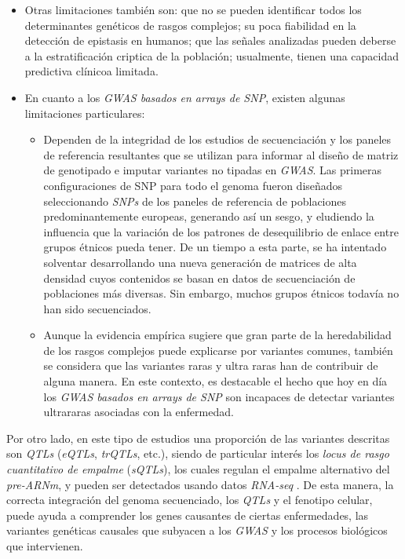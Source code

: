 \documentclass[IB,BIB]{TFUOC}%
\begin{document}
\begin{itemize}
    \item Otras limitaciones también son: que no se pueden identificar todos los determinantes genéticos de rasgos complejos; su poca fiabilidad en la detección de epistasis en humanos; que las señales analizadas pueden deberse a la estratificación criptica de la población; usualmente, tienen una capacidad predictiva clínicoa limitada.
    \item En cuanto a los \textit{GWAS basados en arrays de SNP}, existen algunas limitaciones particulares:
    \begin{itemize}
        \item Dependen de la integridad de los estudios de secuenciación y los paneles de referencia resultantes que se utilizan para informar al diseño de matriz de genotipado e imputar variantes no tipadas en \textit{GWAS}. Las primeras configuraciones de SNP para todo el genoma fueron diseñados seleccionando \textit{SNPs} de los paneles de referencia de poblaciones predominantemente europeas, generando así un sesgo, y eludiendo la influencia que la variación de los patrones de desequilibrio de enlace entre grupos étnicos pueda tener. De un tiempo a esta parte, se ha intentado solventar desarrollando una nueva generación de matrices de alta densidad cuyos contenidos se basan en datos de secuenciación de poblaciones más diversas. Sin embargo, muchos grupos étnicos todavía no han sido secuenciados.
        \item Aunque la evidencia empírica sugiere que gran parte de la heredabilidad de los rasgos complejos puede explicarse por variantes comunes, también se considera que las variantes raras y ultra raras han de contribuir de alguna manera. En este contexto, es destacable el hecho que hoy en día los \textit{GWAS basados en arrays de SNP} son incapaces de detectar variantes ultrararas asociadas con la enfermedad.
    \end{itemize}
\end{itemize}

\normalsize


Por otro lado, en este tipo de estudios una proporción de las variantes descritas son \textit{QTLs} (\textit{eQTLs}, \textit{trQTLs}, etc.), siendo de particular interés los \textit{locus de rasgo cuantitativo de empalme} (\textit{sQTLs}), los cuales regulan el empalme alternativo del \textit{pre-ARNm}, y pueden ser detectados usando datos \textit{RNA-seq} \cite{noauthor_splicing_2021, monlong_identification_2014}. De esta manera, la correcta integración del genoma secuenciado, los \textit{QTLs} y el fenotipo celular, puede ayuda a comprender los genes causantes de ciertas enfermedades, las variantes genéticas causales que subyacen a los \textit{GWAS} y los procesos biológicos que intervienen.
\end{document}
